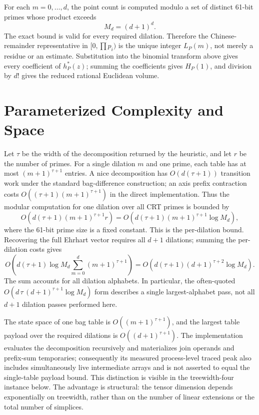 \documentclass[10pt]{article}
\begin{document}
For each $m=0,\ldots,d$, the point count is computed modulo a set of distinct 61-bit primes whose product exceeds
\[
M_d=(d+1)^d.
\]
The exact bound is valid for every required dilation. Therefore the Chinese-remainder representative in $[0,\prod p_i)$ is the unique integer $L_P(m)$, not merely a residue or an estimate. Substitution into the binomial transform above gives every coefficient of $h_P^*(z)$; summing the coefficients gives $H_P(1)$, and division by $d!$ gives the reduced rational Euclidean volume.

\section{Parameterized Complexity and Space}

Let $\tau$ be the width of the decomposition returned by the heuristic, and let $r$ be the number of primes. For a single dilation $m$ and one prime, each table has at most $(m+1)^{\tau+1}$ entries. A nice decomposition has $O(d(\tau+1))$ transition work under the standard bag-difference construction; an axis prefix contraction costs $O((\tau+1)(m+1)^{\tau+1})$ in the direct implementation. Thus the modular computation for one dilation over all CRT primes is bounded by
\[
O\!\left(d(\tau+1)(m+1)^{\tau+1}r\right)
=O\!\left(d(\tau+1)(m+1)^{\tau+1}\log M_d\right),
\]
where the 61-bit prime size is a fixed constant. This is the per-dilation bound. Recovering the full Ehrhart vector requires all $d+1$ dilations; summing the per-dilation costs gives
\[
O\!\left(d(\tau+1)\log M_d\sum_{m=0}^{d}(m+1)^{\tau+1}\right)
=O\!\left(d(\tau+1)(d+1)^{\tau+2}\log M_d\right).
\]
The sum accounts for all dilation alphabets. In particular, the often-quoted $O(d\,\tau\,(d+1)^{\tau+1}\log M_d)$ form describes a single largest-alphabet pass, not all $d+1$ dilation passes performed here.

The state space of one bag table is $O((m+1)^{\tau+1})$, and the largest table payload over the required dilations is $O((d+1)^{\tau+1})$. The implementation evaluates the decomposition recursively and materializes join operands and prefix-sum temporaries; consequently its measured process-level traced peak also includes simultaneously live intermediate arrays and is not asserted to equal the single-table payload bound. This distinction is visible in the treewidth-four instance below. The advantage is structural: the tensor dimension depends exponentially on treewidth, rather than on the number of linear extensions or the total number of simplices.
\end{document}
